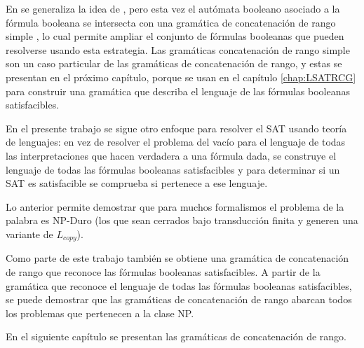 \documentclass[12pt]{article}
\begin{document}
En \cite{aSRCSAT} se generaliza la idea de \cite{aCFSAT}, pero esta vez el autómata booleano asociado a la fórmula booleana se intersecta con una gramática de concatenación de rango simple \cite{mainRCGBib}, lo cual permite ampliar el conjunto de fórmulas booleanas que pueden resolverse usando esta estrategia. Las gramáticas concatenación de rango simple son un caso particular de las gramáticas de concatenación de rango, y estas se presentan en el próximo capítulo, porque se usan en el capítulo \ref{chap:LSATRCG} para construir una gramática que 
describa el lenguaje de las fórmulas booleanas satisfacibles.

En el presente trabajo se sigue otro enfoque para resolver el SAT usando teoría de lenguajes: en vez de resolver el problema del vacío para el lenguaje de todas las interpretaciones que hacen verdadera a una fórmula dada, se construye el lenguaje de todas las fórmulas booleanas satisfacibles y para determinar si un SAT es satisfacible se comprueba si pertenece a ese lenguaje.

Lo anterior permite demostrar que para muchos formalismos el problema de la palabra es NP-Duro (los que sean cerrados bajo transducción finita y generen una variante de $L_{copy}$).

Como parte de este trabajo también se obtiene una gramática de concatenación de rango que reconoce las fórmulas booleanas satisfacibles. A partir de la gramática que reconoce el lenguaje de todas las fórmulas booleanas satisfacibles, se puede demostrar que las gramáticas de concatenación de rango abarcan todos los problemas que pertenecen a la clase NP.

En el siguiente capítulo se presentan las gramáticas de concatenación de rango.
\end{document}
